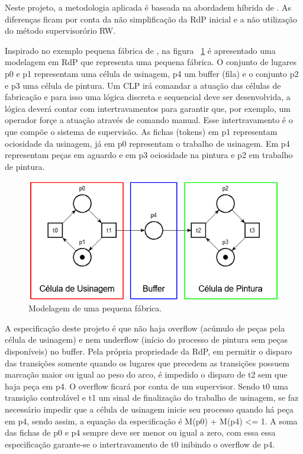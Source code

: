 Neste projeto, a metodologia aplicada \'e baseada na abordadem h\'ibrida de \cite{UzamWonham2005}. As diferen\c{c}as ficam por conta da n\~ao simplifica\c{c}\~ao da RdP inicial e a n\~ao utiliza\c{c}\~ao do m\'etodo supervisor\'orio RW.

Inspirado no exemplo pequena f\'abrica de \cite{apostilacury}, na figura ~\ref{fig:pqnafab} \'e apresentado uma modelagem em RdP que representa uma pequena f\'abrica. O conjunto de lugares p0 e p1 representam uma c\'elula de usinagem, p4 um buffer (fila) e o conjunto p2 e p3 uma c\'elula de pintura. Um CLP ir\'a comandar a atua\c{c}\~ao das c\'elulas de fabrica\c{c}\~ao e para isso uma l\'ogica discreta e sequencial deve ser desenvolvida, a l\'ogica dever\'a contar com intertravamentos para garantir que, por exemplo, um operador for\c{c}e a atua\c{c}\~ao atrav\'es de comando manual. Esse intertravamento \'e o que comp\~oe o sistema de supervis\~ao.
As fichas (tokens) em p1 representam ociosidade da usinagem, j\'a em p0 representam o trabalho de usinagem. Em p4 representam pe\c{c}as em aguardo e em p3 ociosidade na pintura e p2 em trabalho de pintura.\

\begin{figure}[!htb]
	\caption[Modelagem de uma pequena f\'abrica.]{Modelagem de uma pequena f\'abrica.}
	\label{fig:pqnafab}
	\includegraphics[width=16cm]{./figuras/PQNAFAB.png}\centering
\end{figure}

A especifica\c{c}\~ao deste projeto \'e que n\~ao haja overflow (ac\'umulo de pe\c{c}as pela c\'elula de usinagem) e nem underflow (in\'icio do processo de pintura sem pe\c{c}as dispon\'iveis) no buffer. Pela pr\'opria propriedade da RdP, em permitir o disparo das transi\c{c}\~oes somente quando os lugares que precedem as transi\c{c}\~oes possuem marca\c{c}\~ao maior ou igual ao peso do arco, \'e impedido o disparo de t2 sem que haja pe\c{c}a em p4. O overflow ficar\'a por conta de um supervisor. Sendo t0 uma transi\c{c}\~ao control\'avel e t1 um sinal de finaliza\c{c}\~ao do trabalho de usinagem, se faz necess\'ario impedir que a c\'elula de usinagem inicie seu processo quando h\'a pe\c{c}a em p4, sendo assim, a equa\c{c}\~ao da especifica\c{c}\~ao \'e M(p0) + M(p4) <= 1. A soma das fichas de p0 e p4 sempre deve ser menor ou igual a zero, com essa essa especifica\c{c}\~ao garante-se o intertravamento de t0 inibindo o overflow de p4.

